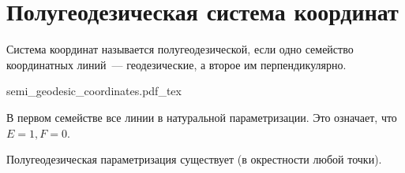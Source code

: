 \documentclass[main]{subfiles}
\begin{document}
\section{Полугеодезическая система координат}
\begin{definition}
    Система координат называется полугеодезической, если одно семейство координатных линий~--- геодезические,
    а второе им перпендикулярно.
    \begin{center}
        {semi_geodesic_coordinates.pdf_tex}
    \end{center}
    В первом семействе все линии в натуральной параметризации.
    Это означает, что $E = 1, F = 0$.
\end{definition}
\begin{theorem}
    Полугеодезическая параметризация существует (в окрестности любой точки).
\end{theorem}
\end{document}
